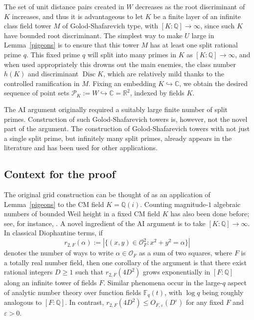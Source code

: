 \documentclass[11pt,reqno]{amsart}
\numberwithin{equation}{section}
\theoremstyle{definition}
\theoremstyle{remark}
\newcommand{\eps}{\varepsilon}
\newcommand{\on}{\operatorname}
\newcommand{\R}{\mathbb{R}}
\newcommand{\C}{\mathbb{C}}
\newcommand{\Q}{\mathbb{Q}}
\newcommand{\Disc}{\on{Disc}}
\renewcommand{\O}{\mathcal{O}}
\begin{document}
The set of unit distance pairs created in $W$
decreases as the root discriminant of $K$ increases,
and thus it is advantageous to let $K$
be a finite layer of an infinite class field tower $M$ of Golod-Shafarevich type,
with $[K:\Q]\to \infty$, since such $K$ have bounded root discriminant.
The simplest way to make $U$ large in Lemma~\ref{pigeons}
is to ensure that this tower $M$ has at least one split rational prime $q$.
This fixed prime $q$ will split into many primes in $K$
as $[K:\Q]\to \infty$, and when used appropriately this drowns out
the main enemies, the class number $h(K)$ and discriminant $\Disc K$, which are relatively mild thanks to the controlled ramification in $M$.
Fixing an embedding $K\hookrightarrow \C$,
we obtain the desired sequence of point sets $\mathcal{P}_K := W \hookrightarrow \C=\R^2$,
indexed by fields $K$.

The AI argument originally required a suitably large finite number of split primes.
Construction of such Golod-Shafarevich towers is, however, not the novel part of the argument.
The construction of Golod-Shafarevich towers
with not just a single split prime,
but infinitely many split primes,
already appears in
the literature \cite{hajir2021cutting}
and has been used for other applications.


\subsection{Context for the proof}

The original grid construction can be thought of as an application of
Lemma~\ref{pigeons} to the CM field $K = \Q(i)$.
Counting magnitude-$1$ algebraic numbers
of bounded Weil height
in a fixed CM field $K$
has also been done before;
see, for instance, \cite{akhtari2025effective,Batyrev1998Manin}.
A novel ingredient of the AI argument is to take $[K:\Q]\to \infty$.
In classical Diophantine terms,
if $$r_{2,F}(\alpha) := |\{(x,y)\in \O_F^2: x^2+y^2 = \alpha\}|$$
denotes the number of ways to write $\alpha\in \O_F$ as a sum of two squares,
where $F$ is a totally real number field, then one corollary of the argument is that
there exist rational integers $D\ge 1$
such that $r_{2,F}(4D^2)$ grows exponentially in $[F:\Q]$
along an infinite tower of fields $F$.
Similar phenomena occur in the large-$q$ aspect
of analytic number theory over function fields $\mathbb{F}_q(t)$,
with $\log q$ being roughly analogous to $[F:\Q]$.
In contrast, $r_{2,F}(4D^2) \le O_{F,\eps}(D^\eps)$ for any fixed $F$ and $\eps>0$.
\end{document}
